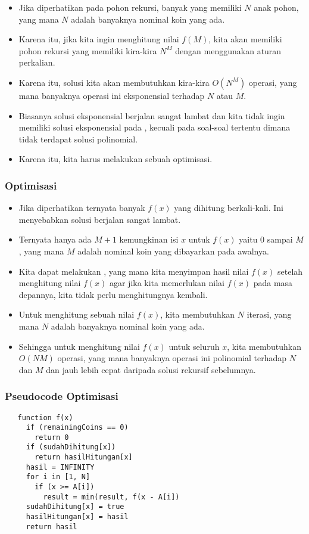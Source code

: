 \begin{frame}
\begin{itemize}
  \item Jika diperhatikan pada pohon rekursi, banyak  yang memiliki $N$ anak pohon, yang mana $N$ adalah banyaknya nominal koin yang ada.
  \item Karena itu, jika kita ingin menghitung nilai $f(M)$, kita akan memiliki pohon rekursi yang memiliki kira-kira $N^M$  dengan menggunakan aturan perkalian.
  \item Karena itu, solusi kita akan membutuhkan kira-kira $O(N^M)$ operasi, yang mana banyaknya operasi ini eksponensial terhadap $N$ atau $M$.
  \item Biasanya solusi eksponensial berjalan sangat lambat dan kita tidak ingin memiliki solusi eksponensial pada , kecuali pada soal-soal tertentu dimana tidak terdapat solusi polinomial. 
  \item Karena itu, kita harus melakukan sebuah optimisasi.
\end{itemize}
\end{frame}

\begin{frame}
\frametitle{Optimisasi}
\begin{itemize}
  \item Jika diperhatikan ternyata banyak $f(x)$ yang dihitung berkali-kali. Ini menyebabkan solusi berjalan sangat lambat.
  \item Ternyata hanya ada $M + 1$ kemungkinan isi $x$ untuk $f(x)$ yaitu $0$ sampai $M$, yang mana $M$ adalah nominal koin yang dibayarkan pada awalnya.
  \item Kita dapat melakukan , yang mana kita menyimpan hasil nilai $f(x)$ setelah menghitung nilai $f(x)$ agar jika kita memerlukan nilai $f(x)$ pada masa depannya, kita tidak perlu menghitungnya kembali.
  \item Untuk menghitung sebuah nilai $f(x)$, kita membutuhkan $N$ iterasi, yang mana $N$ adalah banyaknya nominal koin yang ada.
  \item Sehingga untuk menghitung nilai $f(x)$ untuk seluruh $x$, kita membutuhkan $O(NM)$ operasi, yang mana banyaknya operasi ini polinomial terhadap $N$ dan $M$ dan jauh lebih cepat daripada solusi rekursif sebelumnya.
\end{itemize}
\end{frame}

\begin{frame} [fragile]
\frametitle{Pseudocode Optimisasi}
\begin{lstlisting}
   function f(x)
     if (remainingCoins == 0)
       return 0
     if (sudahDihitung[x])
       return hasilHitungan[x]
     hasil = INFINITY
     for i in [1, N]
       if (x >= A[i])
         result = min(result, f(x - A[i])
     sudahDihitung[x] = true
     hasilHitungan[x] = hasil
     return hasil
\end{lstlisting}
\end{frame}

